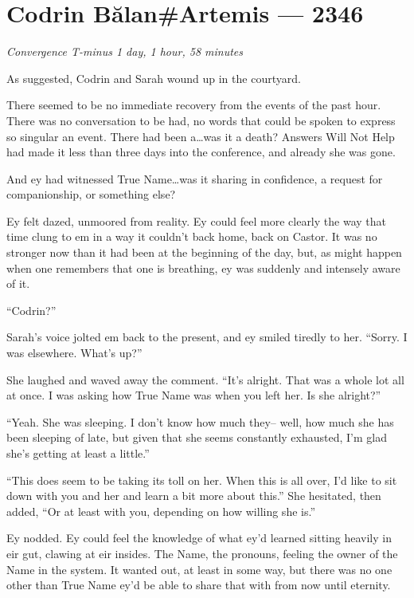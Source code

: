 \hypertarget{codrin-bux103lanartemis-2346}{%
\chapter{Codrin Bălan\#Artemis — 2346}}

\begin{center}
\emph{Convergence T-minus 1 day, 1 hour, 58 minutes}
\end{center}

\noindent As suggested, Codrin and Sarah wound up in the courtyard.

There seemed to be no immediate recovery from the events of the past hour. There was no conversation to be had, no words that could be spoken to express so singular an event. There had been a\ldots{}was it a death? Answers Will Not Help had made it less than three days into the conference, and already she was gone.

And ey had witnessed True Name\ldots{}was it sharing in confidence, a request for companionship, or something else?

Ey felt dazed, unmoored from reality. Ey could feel more clearly the way that time clung to em in a way it couldn't back home, back on Castor. It was no stronger now than it had been at the beginning of the day, but, as might happen when one remembers that one is breathing, ey was suddenly and intensely aware of it.

``Codrin?''

Sarah's voice jolted em back to the present, and ey smiled tiredly to her. ``Sorry. I was elsewhere. What's up?''

She laughed and waved away the comment. ``It's alright. That was a whole lot all at once. I was asking how True Name was when you left her. Is she alright?''

``Yeah. She was sleeping. I don't know how much they-- well, how much she has been sleeping of late, but given that she seems constantly exhausted, I'm glad she's getting at least a little.''

``This does seem to be taking its toll on her. When this is all over, I'd like to sit down with you and her and learn a bit more about this.'' She hesitated, then added, ``Or at least with you, depending on how willing she is.''

Ey nodded. Ey could feel the knowledge of what ey'd learned sitting heavily in eir gut, clawing at eir insides. The Name, the pronouns, feeling the owner of the Name in the system. It wanted out, at least in some way, but there was no one other than True Name ey'd be able to share that with from now until eternity.


